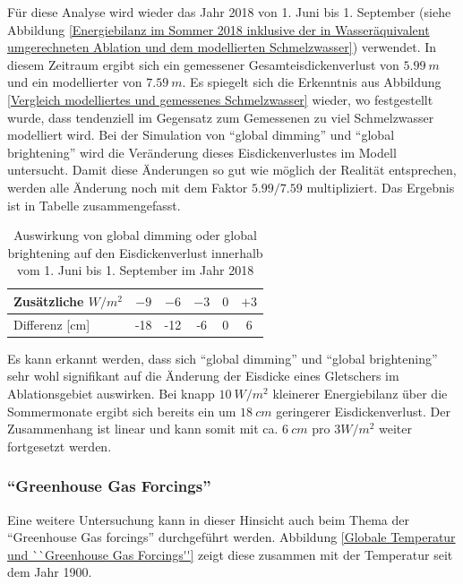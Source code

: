 \documentclass[11pt,a4paper]{article}
\begin{document}
Für diese Analyse wird wieder das Jahr 2018 von 1. Juni bis 1. September (siehe Abbildung \ref{Energiebilanz im Sommer 2018 inklusive der in Wasseräquivalent umgerechneten Ablation und dem modellierten Schmelzwasser}) verwendet. In diesem Zeitraum ergibt sich ein gemessener Gesamteisdickenverlust von $5.99~m$ und ein modellierter von $7.59~m$. Es spiegelt sich die Erkenntnis aus Abbildung \ref{Vergleich modelliertes und gemessenes Schmelzwasser} wieder, wo festgestellt wurde, dass tendenziell im Gegensatz zum Gemessenen zu viel Schmelzwasser modelliert wird. Bei der Simulation von ``global dimming'' und ``global brightening'' wird die Veränderung dieses Eisdickenverlustes im Modell untersucht. Damit diese Änderungen so gut wie möglich der Realität entsprechen, werden alle Änderung noch mit dem Faktor $5.99/7.59$ multipliziert. Das Ergebnis ist in Tabelle zusammengefasst.

\begin{table}[H]
\centering
{} 
\caption{Auswirkung von global dimming oder global brightening auf den Eisdickenverlust innerhalb vom 1. Juni bis 1. September im Jahr 2018}
\label{tab:Auswirkung von global dimming oder global brightening auf den Eisdickenverlust innerhalb vom 1. Juni bis 1. September im Jahr 2018}
\begin{tabular}{|l|c|c|c|c|c|}
\hline
Zusätzliche $W/m^2$       &  $-9$ & $-6$  & $-3$ & $0$ & $+3$ \\ \hline
Differenz {[}cm{]} & -18    & -12 & -6 & 0  & 6  \\ \hline
\end{tabular}
\end{table}

Es kann erkannt werden, dass sich ``global dimming'' und ``global brightening'' sehr wohl signifikant auf die Änderung der Eisdicke eines Gletschers im Ablationsgebiet auswirken. Bei knapp $10~W/m^2$ kleinerer Energiebilanz über  die Sommermonate ergibt sich bereits ein um $18~cm$ geringerer Eisdickenverlust. Der Zusammenhang ist linear und kann somit mit ca. $6~cm$ pro $3 W/m^2$ weiter fortgesetzt werden.\\

\subsubsection{``Greenhouse Gas Forcings''}
Eine weitere Untersuchung kann in dieser Hinsicht auch beim Thema der ``Greenhouse Gas forcings'' durchgeführt werden. Abbildung \ref{Globale Temperatur und ``Greenhouse Gas Forcings''} zeigt diese zusammen mit der Temperatur seit dem Jahr 1900. 
\end{document}
